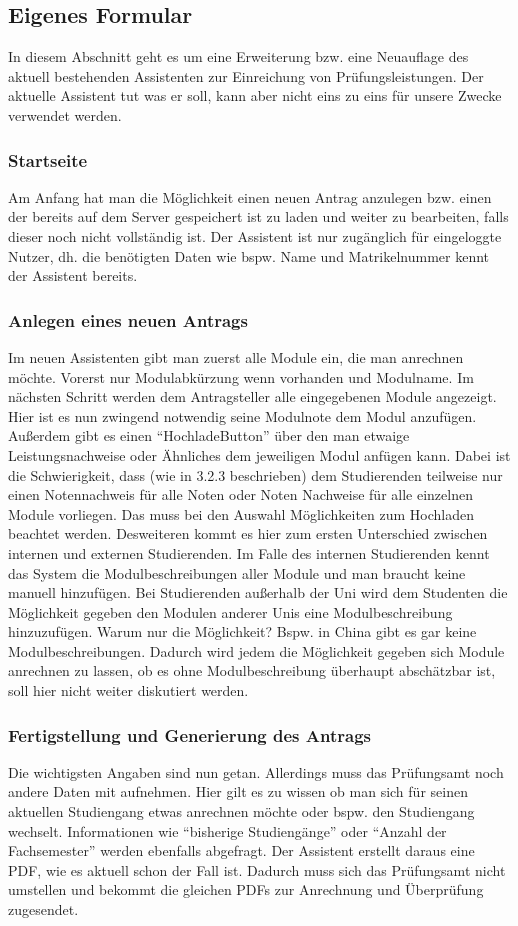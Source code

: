 \subsection{Eigenes Formular}
In diesem Abschnitt geht es um eine Erweiterung bzw. eine Neuauflage des aktuell bestehenden Assistenten zur Einreichung von Prüfungsleistungen. Der aktuelle Assistent tut was er soll, kann aber nicht eins zu eins für unsere Zwecke verwendet werden.

\subsubsection{Startseite}
Am Anfang hat man die Möglichkeit einen neuen Antrag anzulegen bzw. einen der bereits auf dem Server gespeichert ist zu laden und weiter zu bearbeiten, falls dieser noch nicht vollständig ist. Der Assistent ist nur zugänglich für eingeloggte Nutzer, dh. die benötigten Daten wie bspw. Name und Matrikelnummer kennt der Assistent bereits.

\subsubsection{Anlegen eines neuen Antrags}
Im neuen Assistenten gibt man zuerst alle Module ein, die man anrechnen möchte. Vorerst nur Modulabkürzung wenn vorhanden und Modulname. Im nächsten Schritt werden dem Antragsteller alle eingegebenen Module angezeigt.
Hier ist es nun zwingend notwendig seine Modulnote dem Modul anzufügen. Außerdem gibt es einen “HochladeButton” über den man etwaige Leistungsnachweise oder Ähnliches dem jeweiligen Modul anfügen kann. Dabei ist die Schwierigkeit, dass (wie in 3.2.3 beschrieben) dem Studierenden teilweise nur einen Notennachweis für alle Noten oder Noten Nachweise für alle einzelnen Module vorliegen. Das muss bei den Auswahl Möglichkeiten zum Hochladen beachtet werden.
Desweiteren kommt es hier zum ersten Unterschied zwischen internen und externen Studierenden. Im Falle des internen Studierenden kennt das System die Modulbeschreibungen aller Module und man braucht keine manuell hinzufügen. Bei Studierenden außerhalb der Uni wird dem Studenten die Möglichkeit gegeben den Modulen anderer Unis eine Modulbeschreibung hinzuzufügen. Warum nur die Möglichkeit? Bspw. in China gibt es gar keine Modulbeschreibungen. Dadurch wird jedem die Möglichkeit gegeben sich Module anrechnen zu lassen, ob es ohne Modulbeschreibung überhaupt abschätzbar ist, soll hier nicht weiter diskutiert werden.

\subsubsection{Fertigstellung und Generierung des Antrags}
Die wichtigsten Angaben sind nun getan. Allerdings muss das Prüfungsamt noch andere Daten mit aufnehmen. Hier gilt es zu wissen ob man sich für seinen aktuellen Studiengang etwas anrechnen möchte oder bspw. den Studiengang wechselt. Informationen wie “bisherige Studiengänge” oder “Anzahl der Fachsemester” werden ebenfalls abgefragt.
Der Assistent erstellt daraus eine PDF, wie es aktuell schon der Fall ist. Dadurch muss sich das Prüfungsamt nicht umstellen und bekommt die gleichen PDFs zur Anrechnung und Überprüfung zugesendet.


